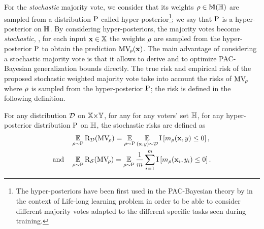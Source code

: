 For the {\it stochastic} majority vote, we consider that its weights $\rho\in\mathbb{M}(\mathbb{H})$ are sampled from a distribution $\mathrm{P}$ called hyper-posterior\footnote{The hyper-posteriors have been first used in the PAC-Bayesian theory by \citet{PentinaLampert2014} in the context of Life-long learning problem in order to be able to consider different majority votes adapted to the different specific tasks seen during training.}; we say that $\mathrm{P}$ is a hyper-posterior on $\mathbb{H}$.
By considering hyper-posteriors, the majority votes become {\it stochastic}, \ie, for each input $\mathbf{x}\in\mathbb{X}$ the weights $\rho$ are sampled from the hyper-posterior $\mathrm{P}$ to obtain the prediction $\text{MV}_{\!\rho}(\mathbf{x})$.
The main advantage of considering a stochastic majority vote is that it allows to derive and to optimize PAC-Bayesian generalization bounds directly.
The true risk and empirical risk of the proposed stochastic weighted majority vote take into account the risks of $\text{MV}_{\!\rho}$ where $\rho$ is sampled from the hyper-posterior $\mathrm{P}$; the risk is defined in the following definition.

\begin{definition} For any distribution $\mathcal{D}$ on $\mathbb{X}{\times}\mathbb{Y}$, for any  for any voters' set $\mathbb{H}$, for any hyper-posterior distribution $\mathrm{P}$ on $\mathbb{H}$, the stochastic risks are defined as
\begin{align*}
    &\operatorname*{\mathbb{E}}_{\rho\sim\mathrm{P}}\text{R}_{\mathcal{D}}(\text{MV}_{\!\rho}) = \operatorname*{\mathbb{E}}_{\rho\sim\mathrm{P}}\operatorname*{\mathbb{E}}_{(\mathbf{x},y)\sim\mathcal{D}}
    \operatorname{I}\left[ m_{\rho}(\mathbf{x}, y) \le 0\right],\\
    \text{and}\quad &\operatorname*{\mathbb{E}}_{\rho\sim\mathrm{P}}\text{R}_{\mathcal{S}}(\text{MV}_{\!\rho}) = \operatorname*{\mathbb{E}}_{\rho\sim\mathrm{P}}\frac{1}{m}\sum_{i=1}^{m}
    \operatorname{I}\left[ m_{\rho}(\mathbf{x}_i, y_i) \le 0\right].
\end{align*}
\end{definition}

